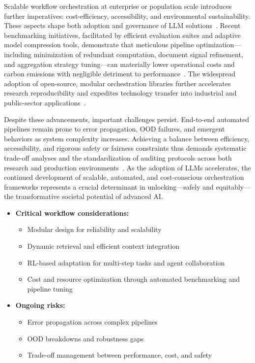 \documentclass[sigconf]{acmart}
\begin{document}
Scalable workflow orchestration at enterprise or population scale introduces further imperatives: cost-efficiency, accessibility, and environmental sustainability. These aspects shape both adoption and governance of LLM solutions~\cite{ref37,ref43,ref55,ref88,ref104}. Recent benchmarking initiatives, facilitated by efficient evaluation suites and adaptive model compression tools, demonstrate that meticulous pipeline optimization—including minimization of redundant computation, document signal refinement, and aggregation strategy tuning—can materially lower operational costs and carbon emissions with negligible detriment to performance~\cite{ref43,ref55,ref88,ref104}. The widespread adoption of open-source, modular orchestration libraries further accelerates research reproducibility and expedites technology transfer into industrial and public-sector applications~\cite{ref37,ref43,ref79,ref86}.

Despite these advancements, important challenges persist. End-to-end automated pipelines remain prone to error propagation, OOD failures, and emergent behaviors as system complexity increases. Achieving a balance between efficiency, accessibility, and rigorous safety or fairness constraints thus demands systematic trade-off analyses and the standardization of auditing protocols across both research and production environments~\cite{ref8,ref43,ref80,ref104}. As the adoption of LLMs accelerates, the continued development of scalable, automated, and cost-conscious orchestration frameworks represents a crucial determinant in unlocking---safely and equitably---the transformative societal potential of advanced AI.

\begin{itemize}
    \item \textbf{Critical workflow considerations:}
        \begin{itemize}
            \item Modular design for reliability and scalability
            \item Dynamic retrieval and efficient context integration
            \item RL-based adaptation for multi-step tasks and agent collaboration
            \item Cost and resource optimization through automated benchmarking and pipeline tuning
        \end{itemize}
    \item \textbf{Ongoing risks:}
        \begin{itemize}
            \item Error propagation across complex pipelines
            \item OOD breakdowns and robustness gaps
            \item Trade-off management between performance, cost, and safety
        \end{itemize}
\end{itemize}
\end{document}
